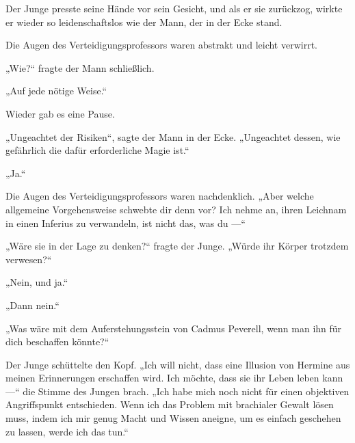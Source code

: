 Der Junge presste seine Hände vor sein Gesicht, und als er sie zurückzog, wirkte er wieder so leidenschaftslos wie der Mann, der in der Ecke stand.

Die Augen des Verteidigungsprofessors waren abstrakt und leicht verwirrt.

„Wie?“ fragte der Mann schließlich.

„Auf jede nötige Weise.“

Wieder gab es eine Pause.

„Ungeachtet der Risiken“, sagte der Mann in der Ecke.
„Ungeachtet dessen, wie gefährlich die dafür erforderliche Magie ist.“

„Ja.“

Die Augen des Verteidigungsprofessors waren nachdenklich.
„Aber welche allgemeine Vorgehensweise schwebte dir denn vor? Ich nehme an, ihren Leichnam in einen Inferius zu verwandeln, ist nicht das, was du —“

„Wäre sie in der Lage zu denken?“ fragte der Junge.
„Würde ihr Körper trotzdem verwesen?“

„Nein, und ja.“

„Dann nein.“

„Was wäre mit dem Auferstehungsstein von Cadmus Peverell, wenn man ihn für dich beschaffen könnte?“

Der Junge schüttelte den Kopf.
„Ich will nicht, dass eine Illusion von Hermine aus meinen Erinnerungen erschaffen wird. Ich möchte, dass sie ihr Leben leben kann —“ die Stimme des Jungen brach.
„Ich habe mich noch nicht für einen objektiven Angriffspunkt entschieden. Wenn ich das Problem mit brachialer Gewalt lösen muss, indem ich mir genug Macht und Wissen aneigne, um es einfach geschehen zu lassen, werde ich das tun.“


